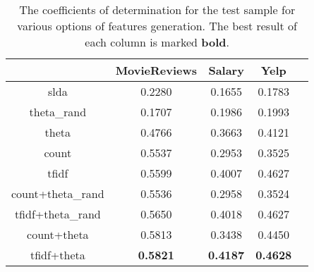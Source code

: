 \documentclass{sig-alternate-2013}
\begin{document}

\begin{table}\footnotesize
    \centering
    \begin{tabular}{|c|c|c|c|c|}
        \hline
        & MovieReviews & Salary & Yelp \\ \hline
        slda & 0.2280 & 0.1655 & 0.1783 \\ \hline
        theta\_rand & 0.1707 & 0.1986 & 0.1993 \\ \hline
        theta & 0.4766 & 0.3663 & 0.4121 \\ \hline
        count & 0.5537 & 0.2953 & 0.3525 \\ \hline
        tfidf & 0.5599 & 0.4007 & 0.4627 \\ \hline
        count+theta\_rand & 0.5536 & 0.2958 & 0.3524 \\ \hline
        tfidf+theta\_rand & 0.5650 & 0.4018 & 0.4627 \\ \hline
        count+theta & 0.5813 & 0.3438 & 0.4450 \\ \hline
        tfidf+theta & \textbf{0.5821} & \textbf{0.4187} & \textbf{0.4628} \\ \hline
    \end{tabular}
    \caption{The coefficients of determination for the test sample for various options of features generation.
    The best result of each column is marked \textbf{bold}.}
    \label{tbl:features_res}
\end{table}



\end{document}
